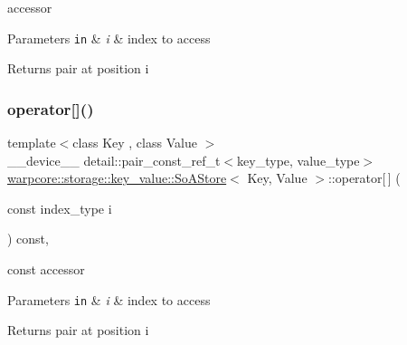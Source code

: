 accessor 


\begin{DoxyParams}[1]{Parameters}
\mbox{\tt in}  & {\em i} & index to access \\
\hline
\end{DoxyParams}
\begin{DoxyReturn}{Returns}
pair at position {\ttfamily i} 
\end{DoxyReturn}
\mbox{\label{classwarpcore_1_1storage_1_1key__value_1_1SoAStore_a8167ef32ca834fb530cf787a83a493d3}} 
\subsubsection{\texorpdfstring{operator[]()}{operator[]()}\hspace{0.1cm}{\footnotesize\ttfamily [2/2]}}
{\footnotesize\ttfamily template$<$class Key , class Value $>$ \\
\+\_\+\+\_\+device\+\_\+\+\_\+ detail\+::pair\+\_\+const\+\_\+ref\+\_\+t$<$key\+\_\+type, value\+\_\+type$>$ \hyperlink{classwarpcore_1_1storage_1_1key__value_1_1SoAStore}{warpcore\+::storage\+::key\+\_\+value\+::\+So\+A\+Store}$<$ Key, Value $>$\+::operator\mbox{[}$\,$\mbox{]} (\begin{DoxyParamCaption}\item[{const index\+\_\+type}]{i }\end{DoxyParamCaption}) const\hspace{0.3cm}{\ttfamily [inline]}, {\ttfamily [noexcept]}}



const accessor 


\begin{DoxyParams}[1]{Parameters}
\mbox{\tt in}  & {\em i} & index to access \\
\hline
\end{DoxyParams}
\begin{DoxyReturn}{Returns}
pair at position {\ttfamily i} 
\end{DoxyReturn}
\mbox{\label{classwarpcore_1_1storage_1_1key__value_1_1SoAStore_afe3a33107f19d895ed0aa78bfedd2de0}} 
